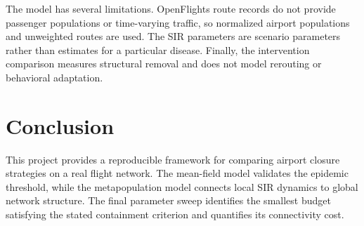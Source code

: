 \documentclass[conference]{IEEEtran}
\begin{document}
The model has several limitations. OpenFlights route records do not provide passenger populations or time-varying traffic, so normalized airport populations and unweighted routes are used. The SIR parameters are scenario parameters rather than estimates for a particular disease. Finally, the intervention comparison measures structural removal and does not model rerouting or behavioral adaptation.

\section{Conclusion}
This project provides a reproducible framework for comparing airport closure strategies on a real flight network. The mean-field model validates the epidemic threshold, while the metapopulation model connects local SIR dynamics to global network structure. The final parameter sweep identifies the smallest budget satisfying the stated containment criterion and quantifies its connectivity cost.



\end{document}
